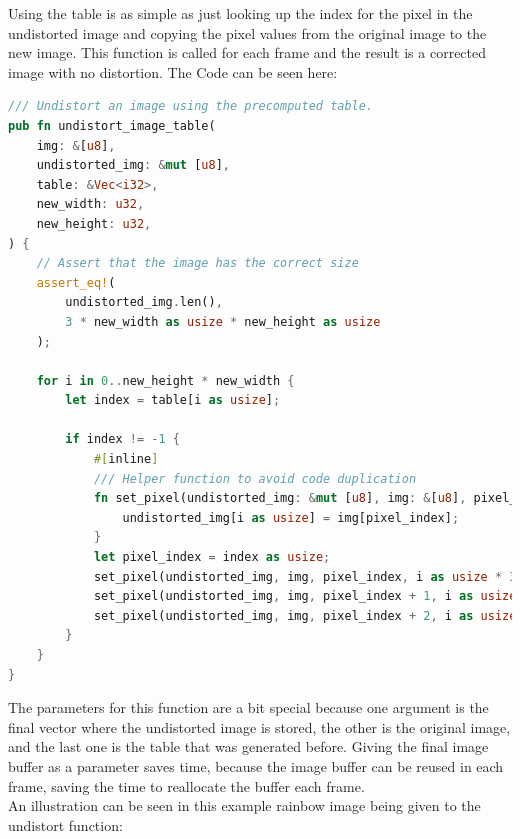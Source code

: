 Using the table is as simple as just looking up the index for the pixel in the undistorted image and copying the pixel values from the original image to the new image.
This function is called for each frame and the result is a corrected image with no distortion.
The Code can be seen here:
\begin{lstlisting}[language=rust,breaklines,label={lst:undistort_image_table}]
/// Undistort an image using the precomputed table.
pub fn undistort_image_table(
    img: &[u8],
    undistorted_img: &mut [u8],
    table: &Vec<i32>,
    new_width: u32,
    new_height: u32,
) {
    // Assert that the image has the correct size
    assert_eq!(
        undistorted_img.len(),
        3 * new_width as usize * new_height as usize
    );

    for i in 0..new_height * new_width {
        let index = table[i as usize];

        if index != -1 {
            #[inline]
            /// Helper function to avoid code duplication
            fn set_pixel(undistorted_img: &mut [u8], img: &[u8], pixel_index: usize, i: usize) {
                undistorted_img[i as usize] = img[pixel_index];
            }
            let pixel_index = index as usize;
            set_pixel(undistorted_img, img, pixel_index, i as usize * 3);
            set_pixel(undistorted_img, img, pixel_index + 1, i as usize * 3 + 1);
            set_pixel(undistorted_img, img, pixel_index + 2, i as usize * 3 + 2);
        }
    }
}
\end{lstlisting}
The parameters for this function are a bit special because one argument is the final vector where the undistorted image is stored, the other is the original image, and the last one is the table that was generated before.
Giving the final image buffer as a parameter saves time, because the image buffer can be reused in each frame, saving the time to reallocate the buffer each frame.
\\
An illustration can be seen in this example rainbow image being given to the undistort function:
